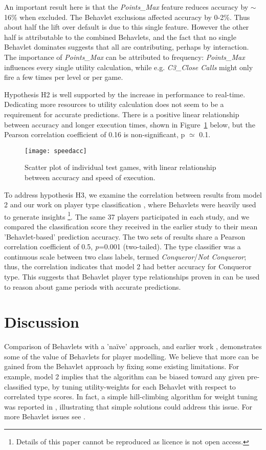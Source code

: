 \documentclass[conference]{IEEEtran}
\begin{document}
An important result here is that the \textit{Points\_Max} feature reduces accuracy by $\sim$16\% when excluded. The Behavlet exclusions affected accuracy by 0-2\%. Thus about half the lift over default is due to this single feature. However the other half is attributable to the combined Behavlets, and the fact that no single Behavlet dominates suggests that all are contributing, perhaps by interaction. The importance of \textit{Points\_Max} can be attributed to frequency: \textit{Points\_Max} influences every single utility calculation, while e.g. \textit{C3\_Close Calls} might only fire a few times per level or per game.

Hypothesis \textsf{H2} is well supported by the increase in performance to real-time. Dedicating more resources to utility calculation does not seem to be a requirement for accurate predictions. There is a positive linear relationship between accuracy and longer execution times, shown in Figure~\ref{fig.speedacc} below, but the Pearson correlation coefficient of 0.16 is non-significant, p $\simeq$ 0.1.


\begin{figure}[!ht]
	\centering
	\texttt{[image: speedacc]}
	\caption{Scatter plot of individual test games, with linear relationship between accuracy and speed of execution.}
	\label{fig.speedacc}
\end{figure}

To address hypothesis \textsf{H3}, we examine the correlation between results from model 2 and our work on player type classification \cite{Cowley2013}, where Behavlets were heavily used to generate insights \footnote{Details of this paper cannot be reproduced as licence is not open access.}. The same 37 players participated in each study, and we compared the classification score they received in the earlier study to their mean 'Behavlet-based' prediction accuracy. The two sets of results share a Pearson correlation coefficient of 0.5, \textit{p}=0.001 (two-tailed). The type classifier was a continuous scale between two class labels, termed \textit{Conqueror}/\textit{Not Conqueror}; thus, the correlation indicates that model 2 had better accuracy for Conqueror type. This suggests that Behavlet player type relationships proven in \cite{Cowley2013} can be used to reason about game periods with accurate predictions.


\section{Discussion}
\label{disc}
Comparison of Behavlets with a 'na{\"i}ve' approach, and earlier work \cite{Cowley2013}, demonstrates some of the value of Behavlets for player modelling. We believe that more can be gained from the Behavlet approach by fixing some existing limitations. For example, model 2 implies that the algorithm can be biased toward any given pre-classified type, by tuning utility-weights for each Behavlet with respect to correlated type scores. In fact, a simple hill-climbing algorithm for weight tuning was reported in \cite{Cowley2009a}, illustrating that simple solutions could address this issue. For more Behavlet issues see \cite{Cowley2016behavlet}.
\end{document}
